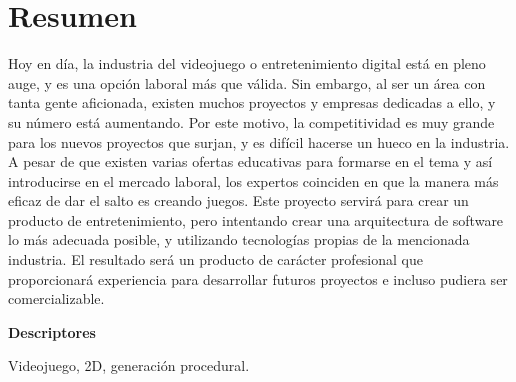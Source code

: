 \chapter*{Resumen}

Hoy en día, la industria del videojuego o entretenimiento digital está en pleno auge, y es una 	opción laboral más que válida. Sin embargo, al ser un área con tanta gente aficionada, 	existen muchos proyectos y empresas dedicadas a ello, y su número está aumentando. Por 	este motivo, la competitividad es muy grande para los nuevos proyectos que surjan, y es 	difícil hacerse un hueco en la industria. A pesar de que existen varias ofertas educativas para 	formarse en el tema y así introducirse en el mercado laboral, los expertos coinciden en que 	la manera más eficaz de dar el salto es creando juegos. Este proyecto servirá para crear un 	producto de entretenimiento, pero intentando crear una arquitectura de software lo más 	adecuada posible, y utilizando tecnologías propias de la mencionada industria. El resultado 	será un producto de carácter profesional que proporcionará experiencia para desarrollar 	futuros proyectos e incluso pudiera ser comercializable.

\vspace{2em}

{\Large\bfseries\sffamily Descriptores}
\vspace{3\medskipamount}

Videojuego, 2D, generación procedural.